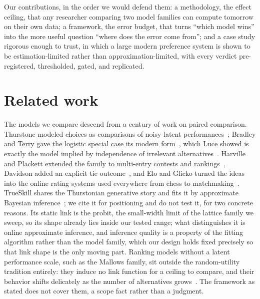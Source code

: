 \documentclass[10pt]{article}
\begin{document}
Our contributions, in the order we would defend them: a methodology,
the effect ceiling, that any researcher comparing two model families
can compute tomorrow on their own data; a framework, the error
budget, that turns ``which model wins'' into the more useful question
``where does the error come from''; and a case study rigorous enough
to trust, in which a large modern preference system is shown to be
estimation-limited rather than approximation-limited, with every
verdict pre-registered, thresholded, gated, and replicated.

\section{Related work}\label{sec:related}

The models we compare descend from a century of work on paired
comparison. Thurstone modeled choices as comparisons of noisy latent
performances~\citep{thurstone1927, mosteller1951}; Bradley and Terry
gave the logistic special case its modern
form~\citep{bradleyterry1952}, which Luce showed is exactly the model
implied by independence of irrelevant
alternatives~\citep{luce1959}. Harville and Plackett extended the
family to multi-entry contests and rankings~\citep{harville1973,
plackett1975}, Davidson added an explicit tie
outcome~\citep{davidson1970}, and Elo and Glicko turned the ideas into
the online rating systems used everywhere from chess to
matchmaking~\citep{elo1978, glickman1999}. TrueSkill shares the
Thurstonian generative story and fits it by approximate Bayesian
inference~\citep{herbrich2007trueskill}; we cite it for positioning
and do not test it, for two concrete reasons. Its static link is the
probit, the small-width limit of the lattice family we sweep, so its
shape already lies inside our tested range; what distinguishes it is
online approximate inference, and inference quality is a property of
the fitting algorithm rather than the model family, which our design
holds fixed precisely so that link shape is the only moving part.
Ranking models without a latent performance scale, such as the Mallows
family, sit outside the random-utility tradition entirely: they induce
no link function for a ceiling to compare, and their behavior shifts
delicately as the number of alternatives
grows~\citep{doignon2004, boehmer2024}. The framework as stated does
not cover them, a scope fact rather than a judgment.
\end{document}
